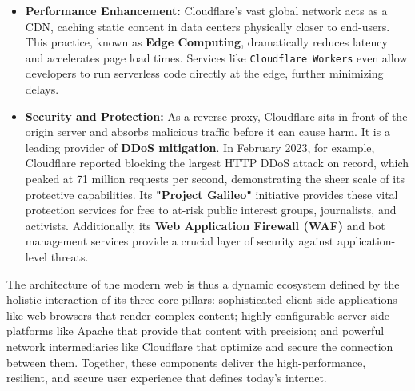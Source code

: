 \documentclass{scrbook}
\begin{document}
\begin{itemize}
    \item \textbf{Performance Enhancement:} Cloudflare's vast global network acts as a CDN, caching static content in data centers physically closer to end-users. This practice, known as \textbf{Edge Computing}, dramatically reduces latency and accelerates page load times. Services like \texttt{Cloudflare Workers} even allow developers to run serverless code directly at the edge, further minimizing delays.
    \item \textbf{Security and Protection:} As a reverse proxy, Cloudflare sits in front of the origin server and absorbs malicious traffic before it can cause harm. It is a leading provider of \textbf{DDoS mitigation}. In February 2023, for example, Cloudflare reported blocking the largest HTTP DDoS attack on record, which peaked at 71 million requests per second, demonstrating the sheer scale of its protective capabilities. Its \textbf{"Project Galileo"} initiative provides these vital protection services for free to at-risk public interest groups, journalists, and activists. Additionally, its \textbf{Web Application Firewall (WAF)} and bot management services provide a crucial layer of security against application-level threats.
\end{itemize}

The architecture of the modern web is thus a dynamic ecosystem defined by the holistic interaction of its three core pillars: sophisticated client-side applications like web browsers that render complex content; highly configurable server-side platforms like Apache that provide that content with precision; and powerful network intermediaries like Cloudflare that optimize and secure the connection between them. Together, these components deliver the high-performance, resilient, and secure user experience that defines today's internet.
\end{document}
